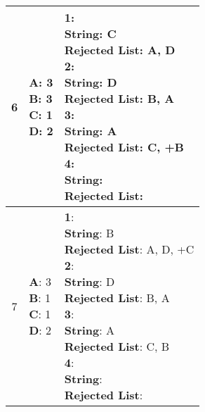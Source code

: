 \documentclass{article}
\begin{document}
\begin{center}
\begin{longtable}{ c|l|l }
        6 & \makecell{\textbf{A}: 3 \\ \textbf{B}: 3 \\ \textbf{C}: 1 \\ \textbf{D}: 2} &  
        \makecell{\textbf{1}:\\ \hspace{10mm} \textbf{String}: C \\ \hspace{10mm} \textbf{Rejected List}: A, D \\
                    \textbf{2}:\\ \hspace{10mm} \textbf{String}: D \\ \hspace{10mm} \textbf{Rejected List}: B, A \\
                    \textbf{3}:\\ \hspace{10mm} \textbf{String}: A \\ \hspace{10mm} \textbf{Rejected List}: C, +B\\
                    \textbf{4}:\\ \hspace{10mm} \textbf{String}:  \\ \hspace{10mm} \textbf{Rejected List}: \\} \\
        \hline 

        7 & \makecell{\textbf{A}: 3 \\ \textbf{B}: 1 \\ \textbf{C}: 1 \\ \textbf{D}: 2} &  
        \makecell{\textbf{1}:\\ \hspace{10mm} \textbf{String}: B \\ \hspace{10mm} \textbf{Rejected List}: A, D, +C \\
                    \textbf{2}:\\ \hspace{10mm} \textbf{String}: D \\ \hspace{10mm} \textbf{Rejected List}: B, A \\
                    \textbf{3}:\\ \hspace{10mm} \textbf{String}: A \\ \hspace{10mm} \textbf{Rejected List}: C, B\\
                    \textbf{4}:\\ \hspace{10mm} \textbf{String}:  \\ \hspace{10mm} \textbf{Rejected List}: \\} \\
        \hline 


\end{longtable}
\end{center}
\end{document}
